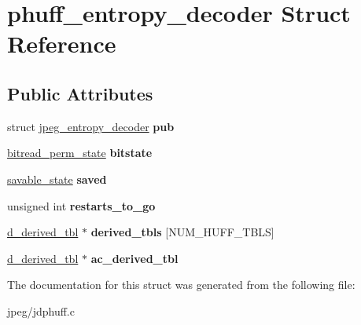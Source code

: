 \hypertarget{structphuff__entropy__decoder}{}\section{phuff\+\_\+entropy\+\_\+decoder Struct Reference}
\label{structphuff__entropy__decoder}
\subsection*{Public Attributes}
\begin{DoxyCompactItemize}
\item 
struct \hyperlink{structjpeg__entropy__decoder}{jpeg\+\_\+entropy\+\_\+decoder} {\bfseries pub}\hypertarget{structphuff__entropy__decoder_a7bb74612f96e3a03251d3cf89d8979bb}{}\label{structphuff__entropy__decoder_a7bb74612f96e3a03251d3cf89d8979bb}

\item 
\hyperlink{structbitread__perm__state}{bitread\+\_\+perm\+\_\+state} {\bfseries bitstate}\hypertarget{structphuff__entropy__decoder_a2a3f89232e35556262e5e743f7d13773}{}\label{structphuff__entropy__decoder_a2a3f89232e35556262e5e743f7d13773}

\item 
\hyperlink{structsavable__state}{savable\+\_\+state} {\bfseries saved}\hypertarget{structphuff__entropy__decoder_a31eede7df3460ef29dec7090d7e0d676}{}\label{structphuff__entropy__decoder_a31eede7df3460ef29dec7090d7e0d676}

\item 
unsigned int {\bfseries restarts\+\_\+to\+\_\+go}\hypertarget{structphuff__entropy__decoder_a3808b78d4268a0454e257b91403232b2}{}\label{structphuff__entropy__decoder_a3808b78d4268a0454e257b91403232b2}

\item 
\hyperlink{structd__derived__tbl}{d\+\_\+derived\+\_\+tbl} $\ast$ {\bfseries derived\+\_\+tbls} \mbox{[}N\+U\+M\+\_\+\+H\+U\+F\+F\+\_\+\+T\+B\+LS\mbox{]}\hypertarget{structphuff__entropy__decoder_abce9cc542850340d672e8980e8bd64be}{}\label{structphuff__entropy__decoder_abce9cc542850340d672e8980e8bd64be}

\item 
\hyperlink{structd__derived__tbl}{d\+\_\+derived\+\_\+tbl} $\ast$ {\bfseries ac\+\_\+derived\+\_\+tbl}\hypertarget{structphuff__entropy__decoder_a4df68d1e72bf6991d185991dbf79dc13}{}\label{structphuff__entropy__decoder_a4df68d1e72bf6991d185991dbf79dc13}

\end{DoxyCompactItemize}


The documentation for this struct was generated from the following file\+:\begin{DoxyCompactItemize}
\item 
jpeg/jdphuff.\+c\end{DoxyCompactItemize}
